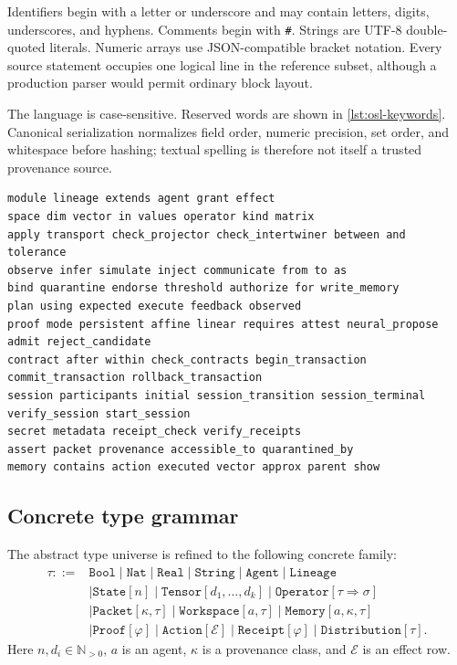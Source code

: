 Identifiers begin with a letter or underscore and may contain letters, digits,
underscores, and hyphens.  Comments begin with \texttt{\#}.  Strings are
UTF-8 double-quoted literals.  Numeric arrays use JSON-compatible bracket
notation.  Every source statement occupies one logical line in the reference
subset, although a production parser would permit ordinary block layout.

The language is case-sensitive.  Reserved words are shown in
\cref{lst:osl-keywords}.  Canonical serialization normalizes field order,
numeric precision, set order, and whitespace before hashing; textual spelling
is therefore not itself a trusted provenance source.

\begin{lstlisting}[style=osl,caption={Reserved words in the finite reference subset.},label={lst:osl-keywords}]
module lineage extends agent grant effect
space dim vector in values operator kind matrix
apply transport check_projector check_intertwiner between and tolerance
observe infer simulate inject communicate from to as
bind quarantine endorse threshold authorize for write_memory
plan using expected execute feedback observed
proof mode persistent affine linear requires attest neural_propose admit reject_candidate
contract after within check_contracts begin_transaction commit_transaction rollback_transaction
session participants initial session_transition session_terminal verify_session start_session
secret metadata receipt_check verify_receipts
assert packet provenance accessible_to quarantined_by
memory contains action executed vector approx parent show
\end{lstlisting}

\subsection{Concrete type grammar}

The abstract type universe is refined to the following concrete family:
\[
\begin{aligned}
\tau ::= {}&
\texttt{Bool}
\mid \texttt{Nat}
\mid \texttt{Real}
\mid \texttt{String}
\mid \texttt{Agent}
\mid \texttt{Lineage}\\
&\mid \texttt{State}[n]
\mid \texttt{Tensor}[d_1,\ldots,d_k]
\mid \texttt{Operator}[\tau\Rightarrow\sigma]\\
&\mid \texttt{Packet}[\kappa,\tau]
\mid \texttt{Workspace}[a,\tau]
\mid \texttt{Memory}[a,\kappa,\tau]\\
&\mid \texttt{Proof}[\varphi]
\mid \texttt{Action}[\mathcal E]
\mid \texttt{Receipt}[\varphi]
\mid \texttt{Distribution}[\tau].
\end{aligned}
\]
Here \(n,d_i\in\mathbb N_{>0}\), \(a\) is an agent, \(\kappa\) is a
provenance class, and \(\mathcal E\) is an effect row.

